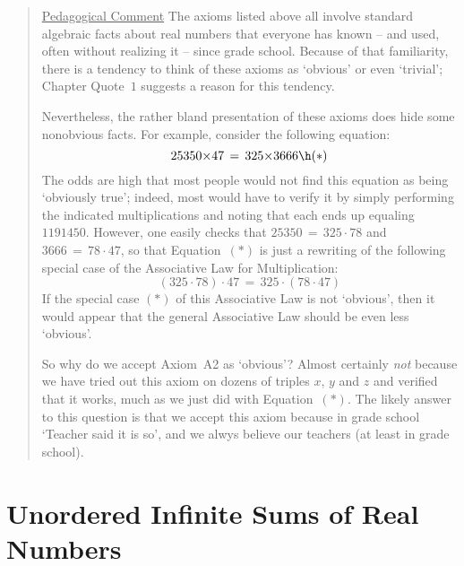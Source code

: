 \begin{quotation}
{\footnotesize \underline{Pedagogical Comment}
    The axioms listed above all involve standard algebraic facts about real numbers that everyone has known -- and used, often without realizing it -- since grade school.
    Because of that familiarity, there is a tendency to think of these axioms as `obvious' or even `trivial';
    Chapter Quote~$1$ suggests a reason for this tendency.

        Nevertheless, the rather bland presentation of these axioms does hide some nonobvious facts.
    For example, consider the following equation:
        \begin{displaymath}
        25350{\times}47 \,=\, 325{\times}3666 \h ({\ast})
        \end{displaymath}
    The odds are high that most people would not find this equation as being `obviously true';
    indeed, most would have to verify it by simply performing the indicated multiplications and noting that each ends up equaling~$1191450$.
    However, one easily checks that $25350 \,=\, 325{\cdot}78$ and $3666 \,=\, 78{\cdot}47$,
     so that Equation~$({\ast})$ is just a rewriting of the following special case of the Associative Law for Multiplication:
        \begin{displaymath}
        (325{\cdot}78){\cdot}47 \,=\, 325{\cdot}(78{\cdot}47)
        \end{displaymath}
    If the special case $({\ast})$ of this Associative Law is not `obvious', then it would appear that the general Associative Law should be even less `obvious'.

        So why do we accept Axiom~A2 as `obvious'? Almost certainly {\em not} because we have tried out this axiom on dozens of triples $x$, $y$ and $z$ and verified that it works,
    much as we just did with Equation~$({\ast})$.
    The likely answer to this question is that we accept this axiom because in grade  school `Teacher said it is so',
    and we alwys believe our teachers (at least in grade school).
}%
\end{quotation}

\V
\V



\V
\V

                \section{{\bf Unordered Infinite Sums of Real Numbers}}
                \label{SectG20}

